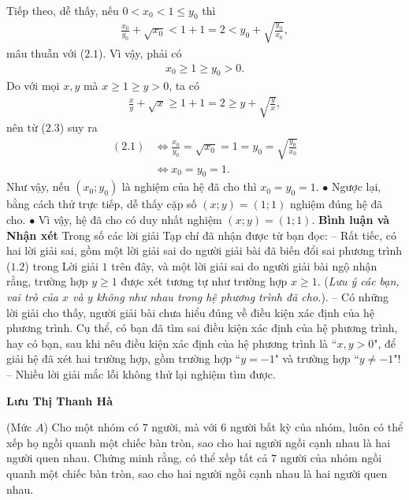 \begin{multicols}{2}
\begin{align*}
	\end{align*}
	Tiếp theo, dễ thấy, nếu $0 < {x_0} < 1 \le {y_0}$  thì
	\begin{align*}
		\frac{{{x_0}}}{{{y_0}}} + \sqrt {{x_0}}  < 1 + 1 = 2 < {y_0} + \sqrt {\frac{{{y_0}}}{{{x_0}}}},
	\end{align*}
	mâu thuẫn với ($2.1$). Vì vậy, phải có 
	\begin{align*}
		{x_0} \ge 1 \ge {y_0} > 0. \tag{$2.3$}
	\end{align*}
	Do với mọi $x, y$ mà  $x \ge 1 \ge y > 0$, ta có
	\begin{align*}
		\frac{x}{y} + \sqrt x  \ge 1 + 1 = 2 \ge y + \sqrt {\frac{y}{x}},
	\end{align*}
	nên từ ($2.3$) suy ra
	\begin{align*}
		(2.1) &\Leftrightarrow \frac{{{x_0}}}{{{y_0}}} = \sqrt {{x_0}}  = 1 = {y_0} = \sqrt {\frac{{{y_0}}}{{{x_0}}}} \\
		&\Leftrightarrow {x_0} = {y_0} = 1.
	\end{align*}
	Như vậy, nếu $\left( {{x_0};{y_0}} \right)$ là nghiệm của hệ đã cho thì $x_0 = y_0 =1$.
	\vskip 0.05cm  
	$\bullet$ Ngược lại, bằng cách thử trực tiếp, dễ thấy cặp số $(x; y) = (1; 1)$ nghiệm đúng hệ đã cho.
	\vskip 0.05cm
	$\bullet$ Vì vậy, hệ đã cho có duy nhất nghiệm $(x; y) = (1; 1)$.
	\vskip 0.05cm
	\textbf{\color{thachthuctoanhoc}Bình luận và Nhận xét}
	\vskip 0.05cm
	Trong số các lời giải Tạp chí đã nhận được từ bạn đọc:
	\vskip 0.05cm
	-- Rất tiếc, có hai lời giải sai, gồm một lời giải sai do người giải bài đã biến đổi sai phương trình ($1.2$) trong Lời giải $1$ trên đây, và một lời giải sai do người giải bài ngộ nhận rằng, trường hợp $y \ge 1$ được xét tương tự như trường hợp $x \ge 1$. (\textit{Lưu ý các bạn, vai trò của $x$ và $y$ không như nhau trong hệ phương trình đã cho.}).
	\vskip 0.05cm
	-- Có những lời giải cho thấy, người giải bài chưa hiểu đúng về điều kiện xác định của hệ phương trình. Cụ thể, có bạn đã tìm sai điều kiện xác định của hệ phương trình, hay có bạn, sau khi nêu điều kiện xác định của hệ phương trình là ``$x, y > 0$", để giải hệ đã xét hai trường hợp, gồm trường hợp ``$y=-1$" và trường hợp ``$y \ne -1$"!
	\vskip 0.05cm
	-- Nhiều lời giải mắc lỗi không thử lại nghiệm tìm được.
	\begin{flushright}
		\textbf{\color{thachthuctoanhoc}Lưu Thị Thanh Hà}
	\end{flushright}
	{}
	(Mức $A$) 
	Cho một nhóm có $7$ người, mà với $6$ người bất kỳ của nhóm, luôn có thể xếp họ ngồi quanh một chiếc bàn tròn, sao cho hai người ngồi cạnh nhau là hai người quen nhau. Chứng minh rằng, có thể xếp tất cả $7$ người của nhóm ngồi quanh một chiếc bàn tròn, sao cho hai người ngồi cạnh nhau là hai người quen nhau.

\end{multicols}
